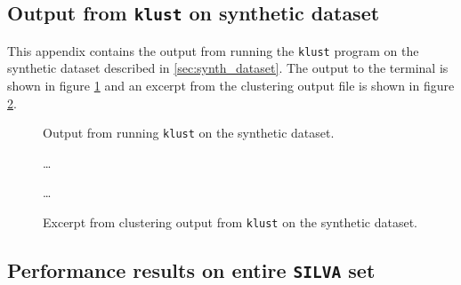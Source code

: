 \subsection{Output from \texttt{klust} on synthetic dataset}
\label{app:synth_dataset}

This appendix contains the output from running the \texttt{klust} program on
the synthetic dataset described in \ref{sec:synth_dataset}. The output to the
terminal is shown in figure \ref{fig:synth_silva_output} and an excerpt from
the clustering output file is shown in figure \ref{fig:synth_silva_clustering}.

\begin{figure}[H]
  \centering
  
  \caption{Output from running \texttt{klust} on the synthetic dataset.}
  \label{fig:synth_silva_output}
\end{figure}

\begin{figure}[H]
  \centering
  
  \dots
  
  \dots
  
  \caption{Excerpt from clustering output from \texttt{klust} on the
    synthetic dataset.}
  \label{fig:synth_silva_clustering}
\end{figure}

\subsection{Performance results on entire \texttt{SILVA} set}
\label{app:performance_results_full_SILVA}

